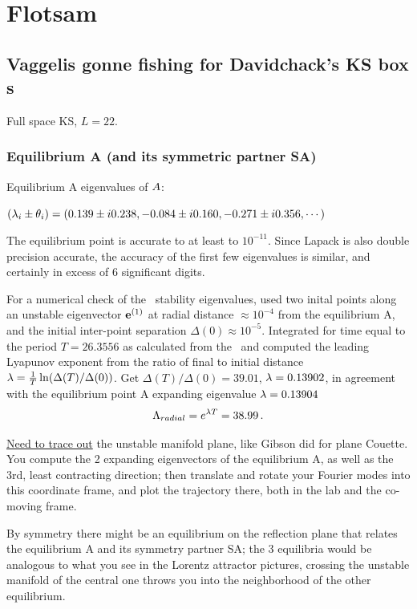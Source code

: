 %

\section{Flotsam}


\subsection{Vaggelis gonne fishing for Davidchack's KS box {\rpo s}}

Full space KS, $L=22$.

\subsubsection{Equilibrium A (and its symmetric partner SA)}

Equilibrium A eigenvalues of ${A}$:

$(\lambda_i \pm \theta_i)
=(
  0.139 \pm i 0.238,
 -0.084 \pm i 0.160,
 -0.271 \pm i 0.356,
\cdots
)$

The equilibrium point is accurate to at least to $10^{-11}$. Since
Lapack is also double precision accurate, the accuracy of the first
few eigenvalues is similar, and certainly in
excess of 6 significant digits.



For a numerical check of the \rpo\ stability eigenvalues,
used two inital
points along an unstable eigenvector ${\bf e}^{(1)}$
at radial distance  $\approx 10^{-4}$ from the equilibrium A,
and the initial inter-point separation $\Delta(0) \approx 10^{-5}$.
Integrated for time equal to the period $T=26.3556$ as calculated from
the \jacobianM\ and computed the leading Lyapunov exponent from the ratio of
final to initial distance 
$\lambda= {1 \over T}\ln( \Delta(T)/\Delta(0))$.
Get
$\Delta(T)/\Delta(0) =39.01$,
$\lambda=0.13902$, in agreement with the equilibrium point A 
expanding eigenvalue $\lambda=0.13904$
\[
\Lambda_{radial} =  e^{\lambda T} =38.99
\,.
\]

\underline{Need to trace out}
the unstable manifold plane, like Gibson did for plane Couette.
You compute the 2 expanding eigenvectors of the
equilibrium A, as well as the 3rd, least contracting direction; then
translate and rotate your Fourier modes into this coordinate frame,
and plot the trajectory there, both in the lab and the co-moving frame.

By symmetry there might be an equilibrium on the reflection plane that
relates the equilibrium A and its symmetry partner SA; the 3 equilibria would
be analogous to what you see in the Lorentz attractor pictures, crossing
the unstable manifold of the central one throws you into the neighborhood
of the other equilibrium.

